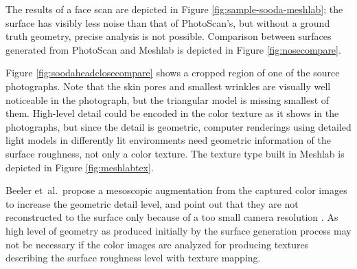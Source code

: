 The results of a face scan are depicted in Figure \ref{fig:sample-sooda-meshlab}; the surface has visibly less noise than that of PhotoScan's, but without a ground truth geometry, precise analysis is not possible.
Comparison between surfaces generated from PhotoScan and Meshlab is depicted in Figure \ref{fig:nosecompare}.

Figure \ref{fig:soodaheadclosecompare} shows a cropped region of one of the source photographs.
Note that the skin pores and smallest wrinkles are visually well noticeable in the photograph, but the triangular model is missing smallest of them.
High-level detail could be encoded in the color texture as it shows in the photographs, but since the detail is geometric, computer renderings using detailed light models in differently lit environments need geometric information of the surface roughness, not only a color texture.
The texture type built in Meshlab is depicted in Figure \ref{fig:meshlabtex}.

Beeler et~al.\ propose a mesoscopic augmentation from the captured color images to increase the geometric detail level, and point out that they are not reconstructed to the surface only because of a too small camera resolution \cite{beeler2010high}.
As high level of geometry as produced initially by the surface generation process may not be necessary if the color images are analyzed for producing textures describing the surface roughness level with texture mapping.



